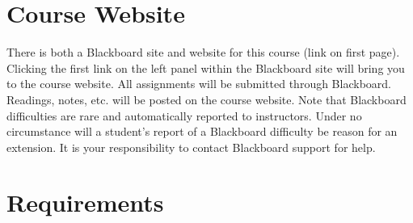 \documentclass[article,oneside]{memoir}
\begin{document}
\section{Course Website}
There is both a Blackboard site and website for this course (link on first page). Clicking the first link on the left panel within the Blackboard site will bring you to the course website. All assignments will be submitted through Blackboard. Readings, notes, etc. will be posted on the course website. Note that Blackboard difficulties are rare and automatically reported to instructors. Under no circumstance will a student's report of a Blackboard difficulty be reason for an extension. It is your responsibility to contact Blackboard support for help.



\section{Requirements}
\end{document}
